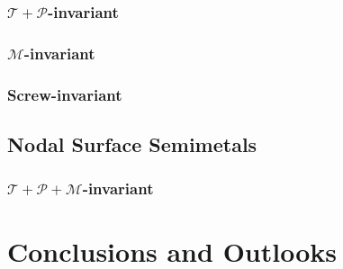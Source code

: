 \subsubsection{$\mathcal{T}+\mathcal{P}$-invariant}
\subsubsection{$\mathcal{M}$-invariant}
\subsubsection{Screw-invariant}

\subsection{Nodal Surface Semimetals}
\subsubsection{$\mathcal{T}+\mathcal{P}+\mathcal{M}$-invariant}

\section{Conclusions and Outlooks}


%
%



%
